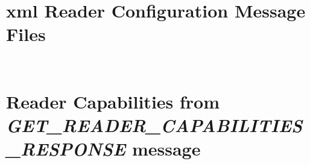 \begin{appendices}
\clearpage

\section{\acs{xml} Reader Configuration Message Files} \label{apx:xmlreaderconfig}
\inputminted[linenos, breaklines, frame=single]{xml}{./code/SET_READER_CONFIG.xml}
\pagebreak
\inputminted[linenos, breaklines, frame=single]{xml}{./code/ADD_ROSPEC.xml}

\clearpage

\section{Reader Capabilities from \textit{GET\_READER\_CAPABILITIES\_RESPONSE} message}
\label{apx:readercapabilities}
\inputminted[linenos, breaklines, frame=single]{xml}{./code/GET_READER_CAPABILITIES_RESPONSE.xml}

\end{appendices}